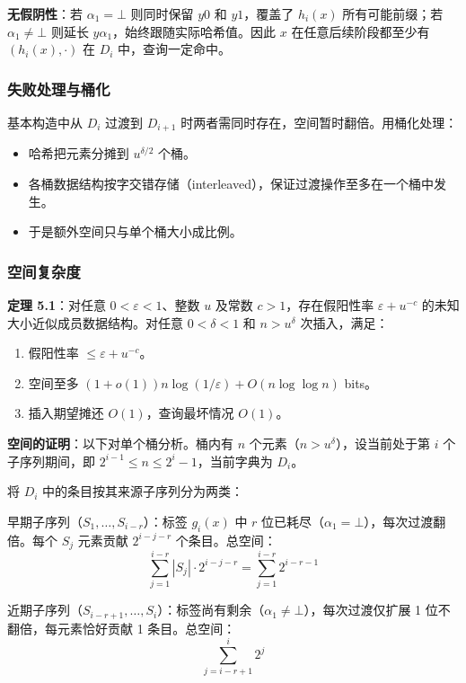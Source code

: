 \documentclass[UTF8,11pt,a4paper]{ctexart}
\begin{document}
\textbf{无假阴性}：若 $\alpha_1 = \bot$ 则同时保留 $y0$ 和 $y1$，覆盖了 $h_i(x)$ 所有可能前缀；若 $\alpha_1 \neq \bot$ 则延长 $y\alpha_1$，始终跟随实际哈希值。因此 $x$ 在任意后续阶段都至少有 $(h_i(x), \cdot)$ 在 $D_i$ 中，查询一定命中。

\subsubsection{失败处理与桶化}

基本构造中从 $D_i$ 过渡到 $D_{i+1}$ 时两者需同时存在，空间暂时翻倍。用桶化处理：
\begin{itemize}
    \item 哈希把元素分摊到 $u^{\delta/2}$ 个桶。
    \item 各桶数据结构按字交错存储（interleaved），保证过渡操作至多在一个桶中发生。
    \item 于是额外空间只与单个桶大小成比例。
\end{itemize}

\subsubsection{空间复杂度}

\textbf{定理 5.1}：对任意 $0 < \varepsilon < 1$、整数 $u$ 及常数 $c > 1$，存在假阳性率 $\varepsilon + u^{-c}$ 的未知大小近似成员数据结构。对任意 $0 < \delta < 1$ 和 $n > u^\delta$ 次插入，满足：
\begin{enumerate}
    \item 假阳性率 $\le \varepsilon + u^{-c}$。
    \item 空间至多 $(1+o(1))n\log(1/\varepsilon) + O(n\log\log n)$ bits。
    \item 插入期望摊还 $O(1)$，查询最坏情况 $O(1)$。
\end{enumerate}

\textbf{空间的证明}：以下对单个桶分析。桶内有 $n$ 个元素（$n > u^\delta$），设当前处于第 $i$ 个子序列期间，即 $2^{i-1} \le n \le 2^i-1$，当前字典为 $D_i$。

将 $D_i$ 中的条目按其来源子序列分为两类：

早期子序列（$S_1, \dots, S_{i-r}$）：标签 $g_i(x)$ 中 $r$ 位已耗尽（$\alpha_1 = \bot$），每次过渡翻倍。每个 $S_j$ 元素贡献 $2^{i-j-r}$ 个条目。总空间：
\[
\sum_{j=1}^{i-r} |S_j| \cdot 2^{i-j-r} = \sum_{j=1}^{i-r} 2^{i-r-1}
\]

近期子序列（$S_{i-r+1}, \dots, S_i$）：标签尚有剩余（$\alpha_1 \neq \bot$），每次过渡仅扩展 1 位不翻倍，每元素恰好贡献 1 条目。总空间：
\[
\sum_{j=i-r+1}^{i} 2^j
\]
\end{document}
